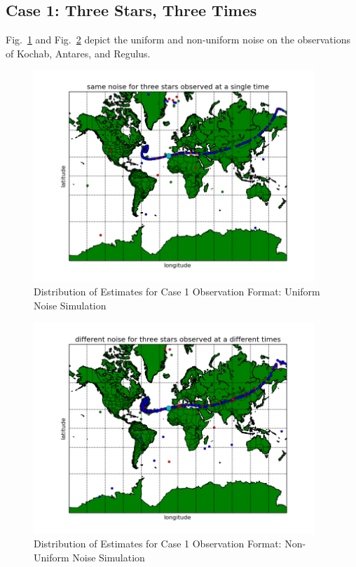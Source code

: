 \documentclass[12pt,a4paper]{book}
\begin{document}
\subsection*{Case 1: Three Stars, Three Times}
Fig.~\ref{f:3s3t_case1} and Fig.~\ref{f:3s3t_case2} depict the uniform and non-uniform noise on the observations of Kochab, Antares, and Regulus.  
\FloatBarrier
\begin{figure}[!h]%
\centering
\includegraphics[height=8cm]{3s3t_case1.png}
\caption{Distribution of Estimates for Case 1 Observation Format: Uniform Noise Simulation}
\label{f:3s3t_case1}
\end{figure}
\begin{figure}[!h]%
\centering
\includegraphics[height=8cm]{3s3t_case2.png}
\caption{Distribution of Estimates for Case 1 Observation Format: Non-Uniform Noise Simulation}
\label{f:3s3t_case2}
\end{figure}
\FloatBarrier
\end{document}

